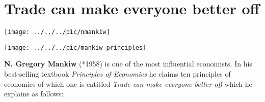 


\pbn
\section{Trade can make everyone better off}\label{sec:mankiw}	
\begin{minipage}{0.5\linewidth}	
	\begin{center}
		\texttt{[image: ../../../pic/nmankiw]}\label{fig:mankiw1}
	\end{center}
\end{minipage}
\begin{minipage}{0.5\linewidth}	
	\begin{center}
		\texttt{[image: ../../../pic/mankiw-principles]}\label{fig:mankiw2}
	\end{center}
\end{minipage}

\textbf{N. Gregory Mankiw }(*1958) is one of the most influential economists. In his best-selling textbook \textit{Principles of Economics} \citep[see][]{Mankiw2020Principles} he claims ten principles of economics of which one is entitled \textit{Trade can make everyone better off} which he explains as follows:


